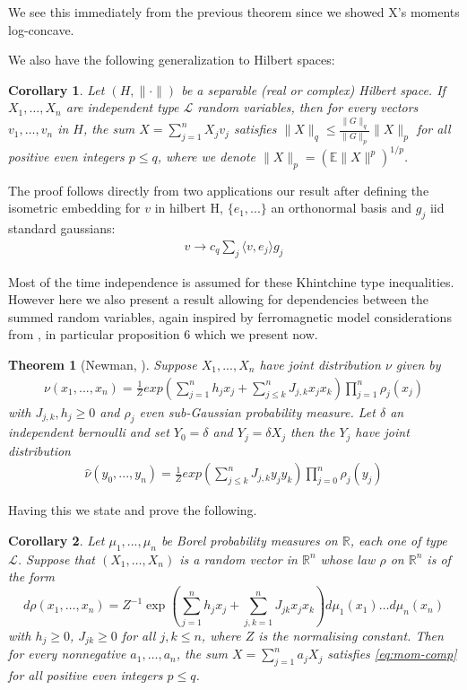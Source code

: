 \documentclass[10pt]{article}
\newcommand{\E}{\mathbb{E}}
\newcommand{\1}{\textbf{1}}
\newcommand{\R}{\mathbb{R}}
\newtheorem{theorem}{Theorem}[subsection]
\newtheorem{corollary}{Corollary}[subsection]
\theoremstyle{remark}
\theoremstyle{definition}
\begin{document}
We see this immediately from the previous theorem since we showed X's moments log-concave. 

We also have the following generalization to Hilbert spaces: 

\begin{corollary}
Let $(H,\|\cdot\|)$ be a separable (real or complex) Hilbert space. If $X_1, \ldots, X_n$ are independent type $\mathcal{L}$ random variables, then for every vectors $v_1, \ldots, v_n$ in $H$, the sum $X = \sum_{j=1}^n X_jv_j$ satisfies $\|X\|_q \leq \frac{\|G\|_q}{\|G\|_p}\|X\|_p$ for all positive even integers $p \leq q$, where we denote $\|X\|_p = (\E\|X\|^p)^{1/p}$.
\end{corollary}

The proof follows directly from two applications our result after defining the isometric embedding for $v$ in hilbert H, $\{e_1,...\}$ an orthonormal basis and $g_j$ iid standard gaussians:
\begin{align*}
	v \to c_q \sum_j \langle v,e_j\rangle g_j
\end{align*}

Most of the time independence is assumed for these Khintchine type inequalities. However here we also present a result allowing for dependencies between the summed random variables, again inspired by ferromagnetic model considerations from \cite{GN}, in particular proposition 6 which we present now.

\begin{theorem}[Newman, \cite{GN}]\label{thm:L3}
	Suppose $X_1,...,X_n$ have joint distribution $\nu$ given by 
	\begin{align*}
		\nu(x_1,...,x_n) = \frac{1}{Z}exp(\sum_{j=1}^n h_j x_j + \sum_{j \leq k}^n J_{j,k}x_jx_k)\prod_{j=1}^n \rho_j(x_j)
	\end{align*}
	with $J_{j,k},h_j \geq 0$ and $\rho_j$ even sub-Gaussian probability measure. Let $\delta$ an independent bernoulli and set $Y_0 = \delta$ and $Y_j = \delta X_j$ then the $Y_j$ have joint distribution 
	\begin{align*}
		\hat{\nu}(y_0,...,y_n) = \frac{1}{Z}exp(\sum_{j \leq k}^n J_{j,k}y_jy_k)\prod_{j=0}^n \rho_j(y_j)
	\end{align*}
\end{theorem}

Having this we state and prove the following.%

\begin{corollary}\label{cor:ferr}
Let $\mu_1, ..., \mu_n$ be Borel probability measures on $\R$, each one of type $\mathcal{L}$. Suppose that $(X_1,\dots,X_n)$ is a random vector in $\R^n$ whose law $\rho$ on $\R^n$ is of the form
\begin{equation}\label{eq:ferr-density}
d\rho(x_1,\ldots,x_n) = Z^{-1}\exp\left(\sum_{j=1}^n h_jx_j+\sum_{j,k=1}^n J_{jk}x_jx_k\right)d\mu_1(x_1)\dots d\mu_n(x_n)
\end{equation}
with $h_j \geq 0$, $J_{jk} \geq 0$ for all $j,k \leq n$, where $Z$ is the normalising constant. Then for every nonnegative $a_1, \ldots, a_n$, the sum $X = \sum_{j=1}^n a_jX_j$ satisfies \eqref{eq:mom-comp} for all positive even integers $p \leq q$.
\end{corollary}
\end{document}
